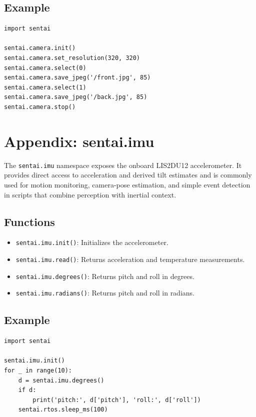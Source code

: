 \subsection{Example}\label{example-5}

\begin{verbatim}
import sentai

sentai.camera.init()
sentai.camera.set_resolution(320, 320)
sentai.camera.select(0)
sentai.camera.save_jpeg('/front.jpg', 85)
sentai.camera.select(1)
sentai.camera.save_jpeg('/back.jpg', 85)
sentai.camera.stop()
\end{verbatim}

\section{Appendix: sentai.imu}\label{appendix-sentai.imu}

The \texttt{sentai.imu} namespace exposes the onboard LIS2DU12
accelerometer. It provides direct access to acceleration and derived
tilt estimates and is commonly used for motion monitoring, camera-pose
estimation, and simple event detection in scripts that combine
perception with inertial context.

\subsection{Functions}\label{functions-6}

\begin{itemize}
\tightlist
\item
  \texttt{sentai.imu.init()}: Initializes the accelerometer.
\item
  \texttt{sentai.imu.read()}: Returns acceleration and temperature
  measurements.
\item
  \texttt{sentai.imu.degrees()}: Returns pitch and roll in degrees.
\item
  \texttt{sentai.imu.radians()}: Returns pitch and roll in radians.
\end{itemize}

\subsection{Example}\label{example-6}

\begin{verbatim}
import sentai

sentai.imu.init()
for _ in range(10):
    d = sentai.imu.degrees()
    if d:
        print('pitch:', d['pitch'], 'roll:', d['roll'])
    sentai.rtos.sleep_ms(100)
\end{verbatim}

